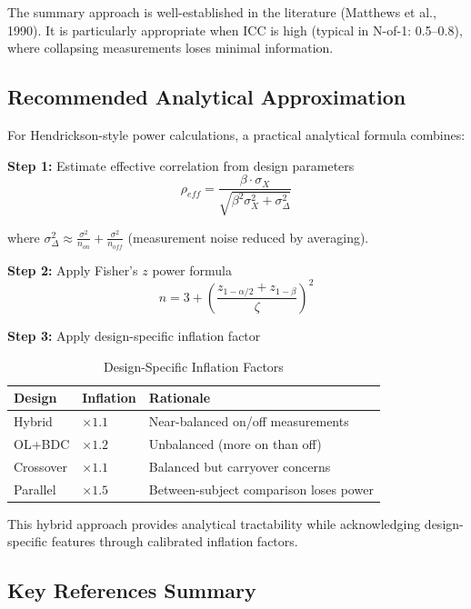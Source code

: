 \documentclass[11pt]{article}
\theoremstyle{definition}
\begin{document}
The summary approach is well-established in the literature (Matthews et al., 1990).
It is particularly appropriate when ICC is high (typical in N-of-1: 0.5--0.8),
where collapsing measurements loses minimal information.

\subsection{Recommended Analytical Approximation}

For Hendrickson-style power calculations, a practical analytical formula combines:

\textbf{Step 1:} Estimate effective correlation from design parameters
\begin{equation}
\rho_{eff} = \frac{\beta \cdot \sigma_X}{\sqrt{\beta^2 \sigma_X^2 + \sigma_{\Delta}^2}}
\end{equation}

where $\sigma_{\Delta}^2 \approx \frac{\sigma^2}{n_{on}} + \frac{\sigma^2}{n_{off}}$
(measurement noise reduced by averaging).

\textbf{Step 2:} Apply Fisher's $z$ power formula
\begin{equation}
n = 3 + \left(\frac{z_{1-\alpha/2} + z_{1-\beta}}{\zeta}\right)^2
\end{equation}

\textbf{Step 3:} Apply design-specific inflation factor

\begin{table}[h]
\centering
\caption{Design-Specific Inflation Factors}
\begin{tabular}{@{}lll@{}}
\toprule
\textbf{Design} & \textbf{Inflation} & \textbf{Rationale} \\
\midrule
Hybrid & $\times 1.1$ & Near-balanced on/off measurements \\
OL+BDC & $\times 1.2$ & Unbalanced (more on than off) \\
Crossover & $\times 1.1$ & Balanced but carryover concerns \\
Parallel & $\times 1.5$ & Between-subject comparison loses power \\
\bottomrule
\end{tabular}
\end{table}

This hybrid approach provides analytical tractability while acknowledging
design-specific features through calibrated inflation factors.

\subsection{Key References Summary}
\end{document}
